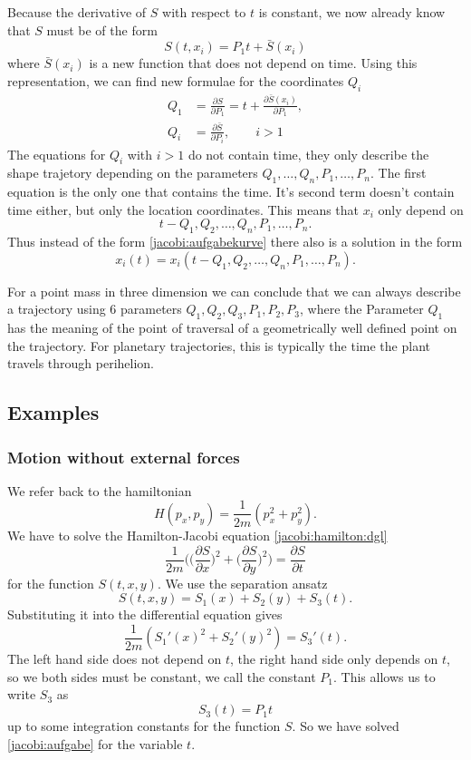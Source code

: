 Because the derivative of $S$ with respect to $t$ is constant, we
now already know that $S$ must be of the form
\[
S(t,x_i)=P_1t + \bar S(x_i)
\]
where $\bar S(x_i)$ is a new function that does not depend on time.
Using this representation, we can find new formulae for the 
coordinates $Q_i$
\begin{align*}
Q_1&=\frac{\partial S}{\partial P_1}=t+\frac{\partial \bar S(x_i)}{\partial P_1},
\\
Q_i&=\frac{\partial \bar S}{\partial P_i},\qquad i>1
\end{align*}
The equations for $Q_i$ with $i>1$ do not contain time,
they only describe the shape trajetory depending on the parameters
$Q_1,\dots,Q_n,P_1,\dots,P_n$.
The first equation is the only one that contains the time.
It's second term doesn't contain time either, but only the location
coordinates.
This means that $x_i$ only depend on 
\[
t-Q_1,Q_2,\dots,Q_n, P_1,\dots,P_n.
\]
Thus instead of the form \eqref{jacobi:aufgabekurve} there also is a 
solution in the form
\[
x_i(t)=x_i(t-Q_1,Q_2, \dots,Q_n,P_1,\dots,P_n).
\]

For a point mass in three dimension we can conclude that we can
always describe a trajectory using 6 parameters
$Q_1,Q_2,Q_3,P_1,P_2,P_3$, where the Parameter $Q_1$ has 
the meaning of the point of traversal of a geometrically well defined
point on the trajectory.
For planetary trajectories, this is typically the time the plant
travels through perihelion.

\subsection{Examples}
\subsubsection{Motion without external forces}
We refer back to the hamiltonian
\[
H(p_x, p_y)=\frac1{2m}(p_x^2+p_y^2).
\]
We have to solve the Hamilton-Jacobi equation \eqref{jacobi:hamilton:dgl}
\[
\frac1{2m}\biggl(
\biggl(\frac{\partial S}{\partial x}\biggr)^2
+
\biggl(\frac{\partial S}{\partial y}\biggr)^2
\biggr)=\frac{\partial S}{\partial t}
\]
for the function $S(t,x,y)$.
We use the separation ansatz
\[
S(t,x,y)=S_1(x)+S_2(y) + S_3(t).
\]
Substituting it into the differential equation gives
\begin{equation}
\frac1{2m}( S_1'(x)^2+S_2'(y)^2)=S_3'(t).
\label{jacobi:kraeftefrei:sep1}
\end{equation}
The left hand side does not depend on $t$, the right hand side only
depends on $t$, so we both sides must be constant, we call the
constant $P_1$.
This allows us to write $S_3$  as
\[
S_3(t)=P_1t
\]
up to some integration constants for the function $S$.
So we have solved \eqref{jacobi:aufgabe} for the variable $t$.


